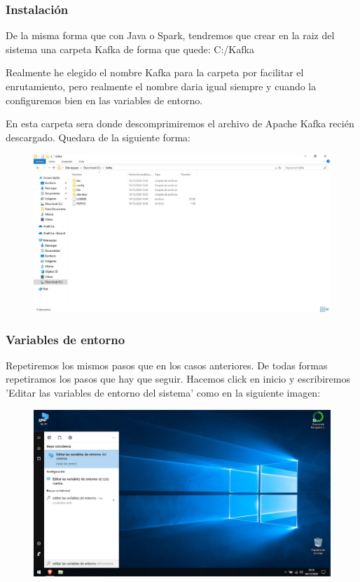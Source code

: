\documentclass[a4paper,10pt]{article}
\begin{document}
\subsubsection{Instalación}

De la misma forma que con Java o Spark, tendremos que crear en la raiz del sistema una carpeta Kafka de forma que quede: C:/Kafka

Realmente he elegido el nombre Kafka para la carpeta por facilitar el enrutamiento, pero realmente el nombre daria igual siempre y cuando la configuremos bien en las variables de entorno. 

En esta carpeta sera donde descomprimiremos el archivo de Apache Kafka recién descargado. Quedara de la siguiente forma: 

\begin{figure}[H]
\begin{center}
\includegraphics[width=450pt]{./fotos/Kafka/03 (V).jpg}
\end{center}
\end{figure}

\subsubsection{Variables de entorno}

Repetiremos los mismos pasos que en los casos anteriores. De todas formas repetiramos los pasos que hay que seguir. Hacemos click en inicio y escribiremos 'Editar las variables de entorno del sistema' como en la siguiente imagen:

\begin{figure}[H]
\begin{center}
\includegraphics[width=425pt]{./fotos/introduccion/7 - Java.jpg}
\end{center}
\end{figure}
\end{document}
